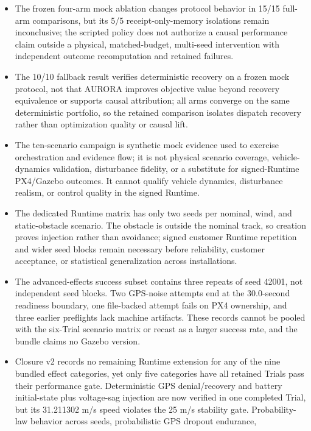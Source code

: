\begin{itemize}
  uncertainty.
\item
  The frozen four-arm mock ablation changes protocol behavior in 15/15
  full-arm comparisons, but its 5/5 receipt-only-memory isolations remain
  inconclusive; the scripted policy does not authorize a causal
  performance claim outside a physical, matched-budget, multi-seed
  intervention with independent outcome recomputation and retained
  failures.
\item
  The 10/10 fallback result verifies deterministic recovery on a
  frozen mock protocol, not that AURORA improves objective value beyond
  recovery equivalence or supports causal attribution; all arms converge
  on the same deterministic portfolio, so the retained comparison
  isolates dispatch recovery rather than optimization quality or causal
  lift.
\item
  The ten-scenario campaign is synthetic mock evidence used to exercise
  orchestration and evidence flow; it is not physical scenario coverage,
  vehicle-dynamics validation, disturbance fidelity, or a substitute for
  signed-Runtime PX4/Gazebo outcomes. It cannot qualify vehicle dynamics,
  disturbance realism, or control quality in the signed Runtime.
\item
  The dedicated Runtime matrix has only two seeds per nominal, wind, and
  static-obstacle scenario. The obstacle is outside the nominal track, so
  creation proves injection rather than avoidance; signed customer
  Runtime repetition and wider seed blocks remain necessary before
  reliability, customer acceptance, or statistical generalization across
  installations.
\item
  The advanced-effects success subset contains three repeats of seed
  42001, not independent seed blocks. Two GPS-noise attempts end at the
  30.0-second readiness boundary, one file-backed attempt fails on PX4
  ownership, and three earlier preflights lack machine artifacts. These
  records cannot be pooled with the six-Trial scenario matrix or recast
  as a larger success rate, and the bundle claims no Gazebo version.
\item
  Closure v2 records no remaining Runtime extension for any of the nine
  bundled effect categories, yet only five categories have all retained
  Trials pass their performance gate. Deterministic GPS denial/recovery and battery initial-state plus
  voltage-sag injection are now verified in one completed Trial, but its
  31.211302 m/s speed violates the 25 m/s stability gate. Probability-law
  behavior across seeds, probabilistic GPS dropout endurance,

\end{itemize}
